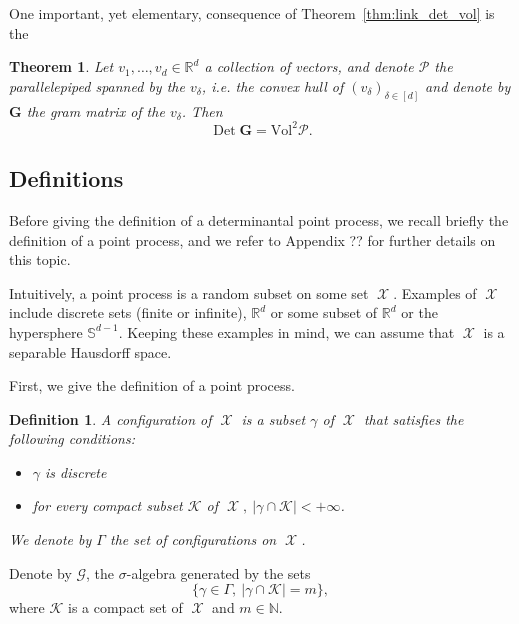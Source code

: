 \documentclass[twoside,11pt]{book}
\newtheorem{theorem}{Theorem}
\newtheorem{definition}{Definition}
\numberwithin{theorem}{chapter}
\numberwithin{definition}{chapter}
\numberwithin{proposition}{chapter}
\numberwithin{corollary}{chapter}
\numberwithin{example}{chapter}
\numberwithin{lemma}{chapter}
\numberwithin{assumption}{chapter}
\DeclareMathOperator{\Det}{Det}
\DeclareMathOperator{\X}{\mathcal{X}}
\begin{document}
One important, yet elementary, consequence of Theorem~\ref{thm:link_det_vol} is the 


\begin{theorem}\label{thm:vol_base_times_height}
Let $v_{1}, \dots, v_{d} \in \mathbb{R}^{d}$ a collection of vectors, and denote $\mathcal{P}$ the parallelepiped spanned by the $v_{\delta}$, i.e. the convex hull of $(v_{\delta})_{\delta \in [d]}$ and denote by $\bm{G}$ the gram matrix of the $v_{\delta}$. Then
\begin{equation}
\Det \bm{G} = \mathrm{Vol}^{2} \mathcal{P}. \nonumber
\end{equation}
\end{theorem}






\subsection{Definitions}
Before giving the definition of a determinantal point process, we recall briefly the definition of a point process, and we refer to Appendix ?? for further details on this topic.

Intuitively, a point process is a random subset on some set $\X$. Examples of $\X$ include discrete sets (finite or infinite), $\mathbb{R}^{d}$ or some subset of $\mathbb{R}^{d}$ or the hypersphere $\mathbb{S}^{d-1}$. Keeping these examples in mind, we can assume that $\X$ is a separable Hausdorff space.


First, we give the definition of a point process. 

\begin{definition}
A configuration of $\X$ is a subset $\gamma$ of $\X$ that satisfies the following conditions:
\begin{itemize}
\item $\gamma$ is discrete 
\item for every compact subset $\mathcal{K}$ of $\X, \: |\gamma \cap \mathcal{K}| < +\infty $.

\end{itemize}
We denote by $\Gamma$ the set of configurations on $\X$.
\end{definition}

Denote by $\mathcal{G}$, the $\sigma$-algebra generated by the sets 
\begin{equation}
\{\gamma \in \Gamma, \: |\gamma \cap \mathcal{K}| = m \},
\end{equation}
where $\mathcal{K}$ is a compact set of $\X$ and $m \in \mathbb{N}$.
\end{document}
